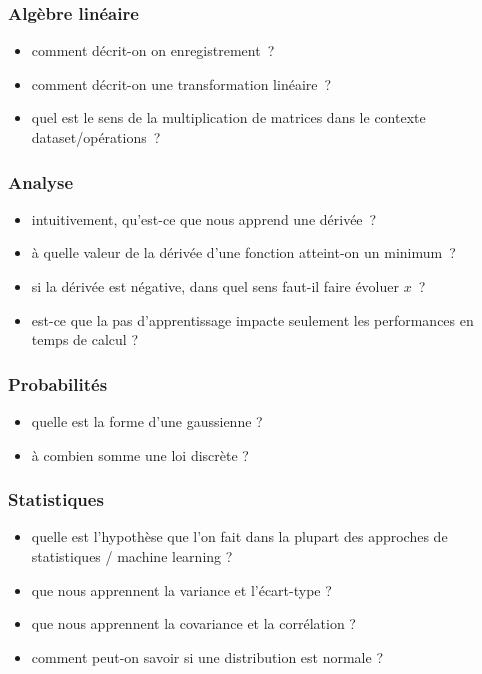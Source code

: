 
\begin{frame}
  \frametitle{Algèbre linéaire}

  \begin{itemize}[<+->]
  \item comment décrit-on on enregistrement ?
  \item comment décrit-on une transformation linéaire ?
  \item quel est le sens de la multiplication de matrices dans le
    contexte dataset/opérations ?
  \end{itemize}
\end{frame}

\begin{frame}
  \frametitle{Analyse}

  \begin{itemize}[<+->]
  \item intuitivement, qu'est-ce que nous apprend une dérivée ?
  \item à quelle valeur de la dérivée d'une fonction atteint-on un
    minimum ?
  \item si la dérivée est négative, dans quel sens faut-il faire
    évoluer $x$ ?
  \item est-ce que la pas d'apprentissage impacte seulement les
    performances en temps de calcul ?
  \end{itemize}
\end{frame}

\begin{frame}
  \frametitle{Probabilités}

  \begin{itemize}[<+->]
  \item quelle est la forme d'une gaussienne ?
  \item à combien somme une loi discrète ?
  \end{itemize}
\end{frame}

\begin{frame}
  \frametitle{Statistiques}

  \begin{itemize}[<+->]
  \item quelle est l'hypothèse que l'on fait dans la plupart des
    approches de statistiques / machine learning ?
  \item que nous apprennent la variance et l'écart-type ?
  \item que nous apprennent la covariance et la corrélation ?
  \item comment peut-on savoir si une distribution est normale ?
  \end{itemize}
\end{frame}

